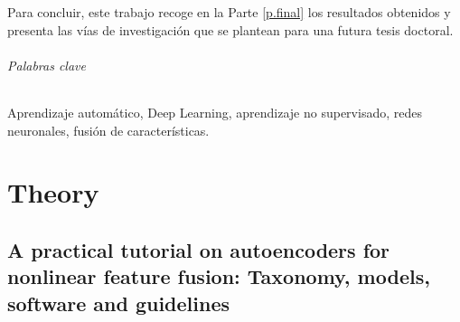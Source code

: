 \documentclass[oneside,openright,titlepage,numbers=noenddot,openany,headinclude,footinclude=true,
cleardoublepage=empty,abstractoff,BCOR=5mm,paper=a4,fontsize=12pt,main=spanish]{scrreprt}
\begin{document}
Para concluir, este trabajo recoge en la Parte \ref{p.final} los resultados obtenidos y presenta las vías de investigación que se plantean para una futura tesis doctoral.

\paragraph{Palabras clave} Aprendizaje automático, Deep Learning, aprendizaje no supervisado, redes neuronales, fusión de características.

\part{Theory}
\label{p.theory}






\chapter{A practical tutorial on autoencoders for nonlinear feature fusion: Taxonomy, models, software and guidelines}



\end{document}
